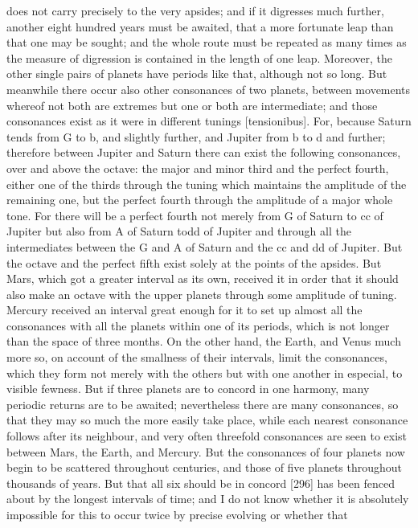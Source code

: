 \documentclass{article}
\begin{document}
does not carry precisely to the very apsides; and if it digresses much
further, another eight hundred years must be awaited, that a more
fortunate leap than that one may be sought; and the whole route must be
repeated as many times as the measure of digression is contained in the
length of one leap. Moreover, the other single pairs of planets have
periods like that, although not so long. But meanwhile there occur also
other consonances of two planets, between movements whereof not both
are extremes but one or both are intermediate; and those consonances
exist as it were in different tunings [tensionibus]. For, because Saturn
tends from G to b, and slightly further, and Jupiter from b to d and
further; therefore between Jupiter and Saturn there can exist the
following consonances, over and above the octave: the major and minor
third and the perfect fourth, either one of the thirds through the tuning
which maintains the amplitude of the remaining one, but the perfect
fourth through the amplitude of a major whole tone. For there will be a
perfect fourth not merely from G of Saturn to cc of Jupiter but also
from A of Saturn todd of Jupiter and through all the intermediates
between the G and A of Saturn and the cc and dd of Jupiter. But the
octave and the perfect fifth exist solely at the points of the apsides. But
Mars, which got a greater interval as its own, received it in order that it
should also make an octave with the upper planets through some
amplitude of tuning. Mercury received an interval great enough for it to
set up almost all the consonances with all the planets within one of its
periods, which is not longer than the space of three months. On the other
hand, the Earth, and Venus much more so, on account of the smallness
of their intervals, limit the consonances, which they form not merely
with the others but with one another in especial, to visible fewness. But if
three planets are to concord in one harmony, many periodic returns are
to be awaited; nevertheless there are many consonances, so that they
may so much the more easily take place, while each nearest consonance
follows after its neighbour, and very often threefold consonances are
seen to exist between Mars, the Earth, and Mercury. But the
consonances of four planets now begin to be scattered throughout
centuries, and those of five planets throughout thousands of years.
But that all six should be in concord [296] has been fenced about by the
longest intervals of time; and I do not know whether it is absolutely
impossible for this to occur twice by precise evolving or whether that
\end{document}
